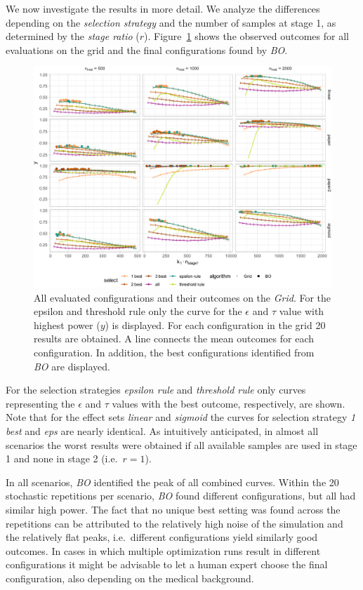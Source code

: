 \documentclass[bimj,fleqn]{w-art}
\theoremstyle{plain}
\theoremstyle{definition}
\begin{document}
We now investigate the results in more detail.
We analyze the differences depending on the \emph{selection strategy} and the number of samples at stage 1, as determined by the \emph{stage ratio} ($r$).
Figure~\ref{fig:plot_allbest} shows the observed outcomes for all evaluations on the grid and the final configurations found by \emph{BO}.
\begin{figure}[htb]
\centering
\includegraphics[width=\linewidth]{generated/figures/plot_allbest.pdf}
\caption{%
  All evaluated configurations and their outcomes on the \emph{Grid}.
  For the epsilon and threshold rule only the curve for the $\epsilon$ and $\tau$ value with highest power ($y$) is displayed.
  For each configuration in the grid 20 %
  results are obtained.
  A line connects the mean outcomes for each configuration.
  In addition, the best configurations identified from \emph{BO} are displayed.
  }
\label{fig:plot_allbest}
\end{figure}
For the selection strategies \emph{epsilon rule} and \emph{threshold rule} only curves representing the $\epsilon$ and $\tau$ values with the best outcome, respectively, are shown.
Note that for the effect sets \emph{linear} and \emph{sigmoid} the curves for selection strategy \emph{1 best} and \emph{eps} are nearly identical.
As intuitively anticipated, in almost all scenarios the worst results were obtained if all available samples are used in stage 1 and none in stage 2 (i.e.\ $r=1$).

In all scenarios, \emph{BO} identified the peak of all combined curves.
Within the 20 stochastic repetitions per scenario, \emph{BO} found different configurations, but all had similar high power.
The fact that no unique best setting was found across the repetitions can be attributed to the relatively high noise of the simulation and the relatively flat peaks, i.e.\ different configurations yield similarly good outcomes.
In cases in which multiple optimization runs result in different configurations it might be advisable to let a human expert choose the final configuration, also depending on the medical background.
\end{document}
